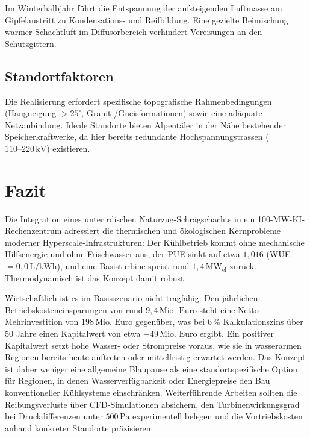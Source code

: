 \documentclass[journal]{IEEEtran}
\begin{document}
Im Winterhalbjahr führt die Entspannung der aufsteigenden Luftmasse am Gipfelaustritt zu Kondensations- und Reifbildung. Eine gezielte Beimischung warmer Schachtluft im Diffusorbereich verhindert Vereisungen an den Schutzgittern.

\subsection{Standortfaktoren}
Die Realisierung erfordert spezifische topografische Rahmenbedingungen (Hangneigung $> 25^\circ$, Granit-/Gneisformationen) sowie eine adäquate Netzanbindung. Ideale Standorte bieten Alpentäler in der Nähe bestehender Speicherkraftwerke, da hier bereits redundante Hochspannungstrassen ($110\text{--}220\,\text{kV}$) existieren.

\section{Fazit}
Die Integration eines unterirdischen Naturzug-Schrägschachts in ein 100-MW-KI-Rechenzentrum adressiert die thermischen und ökologischen Kernprobleme moderner Hyperscale-Infrastrukturen: Der Kühlbetrieb kommt ohne mechanische Hilfsenergie und ohne Frischwasser aus, der PUE sinkt auf etwa $1{,}016$ (WUE $= 0{,}0\,\text{L/kWh}$), und eine Basisturbine speist rund $1{,}4\,\text{MW}_{\text{el}}$ zurück. Thermodynamisch ist das Konzept damit robust.

Wirtschaftlich ist es im Basisszenario nicht tragfähig: Den jährlichen Betriebskosteneinsparungen von rund $9{,}4\,\text{Mio. Euro}$ steht eine Netto-Mehrinvestition von $198\,\text{Mio. Euro}$ gegenüber, was bei $6\,\%$ Kalkulationszins über 50 Jahre einen Kapitalwert von etwa $-49\,\text{Mio. Euro}$ ergibt. Ein positiver Kapitalwert setzt hohe Wasser- oder Strompreise voraus, wie sie in wasserarmen Regionen bereits heute auftreten oder mittelfristig erwartet werden. Das Konzept ist daher weniger eine allgemeine Blaupause als eine standortspezifische Option für Regionen, in denen Wasserverfügbarkeit oder Energiepreise den Bau konventioneller Kühlsysteme einschränken. Weiterführende Arbeiten sollten die Reibungsverluste über CFD-Simulationen absichern, den Turbinenwirkungsgrad bei Druckdifferenzen unter $500\,\text{Pa}$ experimentell belegen und die Vortriebskosten anhand konkreter Standorte präzisieren.
\end{document}
